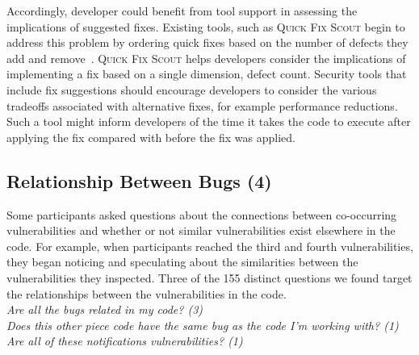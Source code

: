 \documentclass[conference]{IEEEtran}
\begin{document}
Accordingly, developer could benefit from tool support in assessing the implications of suggested fixes.
Existing tools, such as \textsc{Quick Fix Scout} begin to address this problem by ordering quick fixes based on the number of defects they add and remove~\cite{mucslu2012speculative}.
\textsc{Quick Fix Scout} helps developers consider the implications of implementing a fix based on a single dimension, defect count.
Security tools that include fix suggestions should encourage developers to consider the various tradeoffs associated with alternative fixes, for example performance reductions.
Such a tool might inform developers of the time it takes the code to execute after applying the fix compared with before the fix was applied.



\noindent\subsection{\textbf{Relationship Between Bugs (4)}}\label{rbb}

Some participants asked questions about the connections between co-occurring vulnerabilities and whether or not similar vulnerabilities exist elsewhere in the code. 
For example, when participants reached the third and fourth vulnerabilities, they began noticing and speculating about the similarities between the vulnerabilities they inspected.
Three of the 155 distinct questions we found target the relationships between the vulnerabilities in the code. 
\\

\noindent\emph{Are all the bugs related in my code? (3)} \\
\emph{Does this other piece code have the same bug as the code I'm working with? (1)} \\
\emph{Are all of these notifications vulnerabilities? (1)} \\
\end{document}
